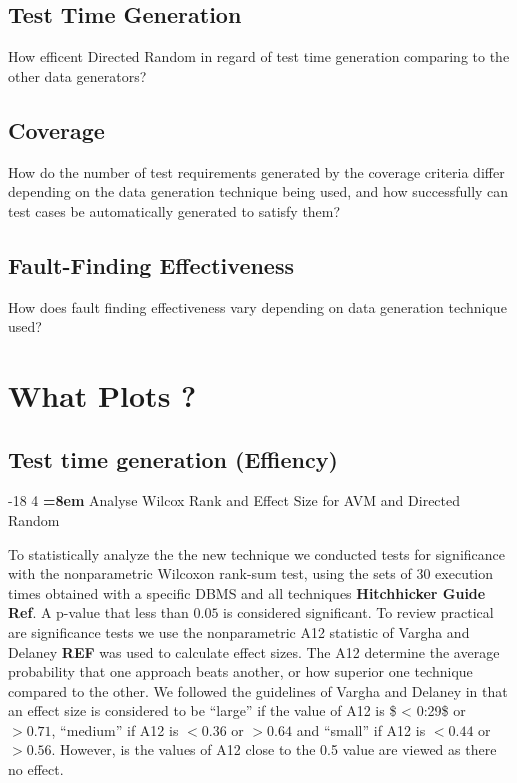 \documentclass[runningheads,a4paper]{llncs}
\makeatletter
\renewcommand\subsubsection{\@startsection{subsubsection}{3}{\z@}%
                       {-18\p@ \@plus -4\p@ \@minus -4\p@}%
                       {4\p@ \@plus 2\p@ \@minus 2\p@}%
                       {\normalfont\normalsize\bfseries\boldmath
                        \rightskip=\z@ \@plus 8em\pretolerance=10000 }}
\makeatother
\begin{document}
\subsection{Test Time Generation}\label{test-time-generation}

How efficent Directed Random in regard of test time generation comparing
to the other data generators?

\subsection{Coverage}\label{coverage}

How do the number of test requirements generated by the coverage
criteria differ depending on the data generation technique being used,
and how successfully can test cases be automatically generated to
satisfy them?

\subsection{Fault-Finding
Effectiveness}\label{fault-finding-effectiveness}

How does fault finding effectiveness vary depending on data generation
technique used?

\section{What Plots ?}\label{what-plots}

\subsection{Test time generation
(Effiency)}\label{test-time-generation-effiency}

\subsubsection{Analyse Wilcox Rank and Effect Size for AVM and Directed
Random}\label{analyse-wilcox-rank-and-effect-size-for-avm-and-directed-random}

To statistically analyze the the new technique we conducted tests for
significance with the nonparametric Wilcoxon rank-sum test, using the
sets of 30 execution times obtained with a specific DBMS and all
techniques \textbf{Hitchhicker Guide Ref}. A p-value that less than
\(0.05\) is considered significant. To review practical are significance
tests we use the nonparametric A12 statistic of Vargha and Delaney
\textbf{REF} was used to calculate effect sizes. The A12 determine the
average probability that one approach beats another, or how superior one
technique compared to the other. We followed the guidelines of Vargha
and Delaney in that an effect size is considered to be \enquote{large}
if the value of A12 is \$ \textless{} 0:29\$ or \(> 0.71\),
\enquote{medium} if A12 is \(< 0.36\) or \(> 0.64\) and \enquote{small}
if A12 is \(< 0.44\) or \(> 0.56\). However, is the values of A12 close
to the 0.5 value are viewed as there no effect.
\end{document}
